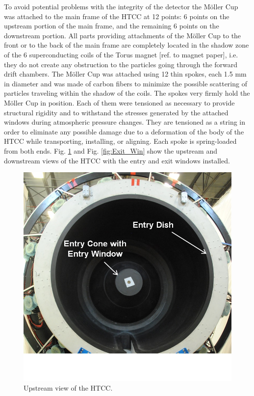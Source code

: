 To avoid potential problems with the integrity of the detector the M{\" o}ller  Cup was attached to the main frame of the HTCC at 12 points: 6 points on the upstream portion of the main frame, and the remaining 6 points on the downstream portion. All parts providing attachments of the M{\" o}ller  Cup to the front or to the back of the main frame are completely located in the shadow zone of the 6 superconducting coils of the Torus magnet [ref. to magnet paper], i.e. they do not create any obstruction to the particles going through the forward drift chambers. The M{\" o}ller  Cup was attached using 12 thin spokes, each 1.5 mm in diameter and was made of carbon fibers to minimize the possible scattering of particles traveling within the shadow of the coils. The spokes very firmly hold the M{\" o}ller  Cup in position. Each of them were tensioned as necessary to provide structural rigidity and to withstand the stresses generated by the attached windows during atmospheric pressure changes. They are tensioned as a string in order to eliminate any possible damage due to a deformation of the body of the HTCC while transporting, installing, or aligning. Each spoke is spring-loaded from both ends. Fig. \ref{fig:Front_View} and Fig. \ref{fig:Exit_Win} show the upstream and downstream views of the HTCC with the entry and exit windows installed.

\begin{figure}[ht]
    \centering
    \includegraphics[width=1.0\linewidth,trim={0 2.5cm 0 0},clip]{images/Front_View}
    \caption{Upstream view of the HTCC.}
    \label{fig:Front_View}
\end{figure}



